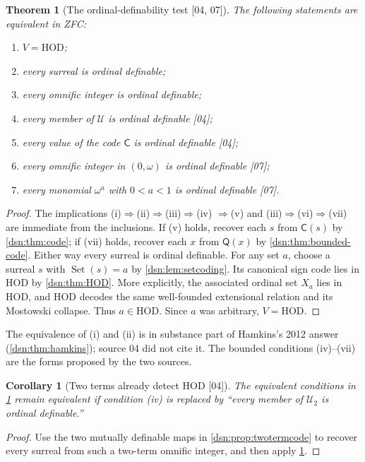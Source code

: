 \documentclass[11pt,a4paper]{article}
\numberwithin{equation}{section}
\newtheorem{theorem}{Theorem}[section]
\newtheorem{corollary}[corollary]{Corollary}
\theoremstyle{definition}
\theoremstyle{remark}
\newcommand{\HOD}{\mathrm{HOD}}
\newcommand{\Code}{\mathsf C}
\newcommand{\Mc}{\mathsf Q}
\newcommand{\SetDec}{\operatorname{Set}}
\newcommand{\Cell}{\mathcal U}
\newcommand{\src}[1]{\textup{\textsf{\small[#1]}}}
\begin{document}
\begin{theorem}[The ordinal-definability test \src{04, 07}]\label{dsn:thm:globalOD}
The following statements are equivalent in ZFC:
\begin{enumerate}[label=\textup{(\roman*)}]
\item $V=\HOD$;
\item every surreal is ordinal definable;
\item every omnific integer is ordinal definable;
\item every member of $\Cell$ is ordinal definable \src{04};
\item every value of the code $\Code$ is ordinal definable \src{04};
\item every omnific integer in $(0,\omega)$ is ordinal definable \src{07};
\item every monomial $\omega^a$ with $0<a<1$ is ordinal definable \src{07}.
\end{enumerate}
\end{theorem}
\begin{proof}
The implications (i)$\Rightarrow$(ii)$\Rightarrow$(iii)$\Rightarrow$(iv)
$\Rightarrow$(v) and (iii)$\Rightarrow$(vi)$\Rightarrow$(vii) are immediate
from the inclusions. If (v) holds, recover each $s$ from $\Code(s)$ by
\cref{dsn:thm:code}; if (vii) holds, recover each $x$ from $\Mc(x)$ by
\cref{dsn:thm:bounded-code}. Either way every surreal is ordinal definable.
For any set $a$, choose a surreal $s$ with $\SetDec(s)=a$ by
\cref{dsn:lem:setcoding}. Its canonical sign code lies in $\HOD$ by
\cref{dsn:thm:HOD}. More explicitly, the associated ordinal set $X_a$ lies
in $\HOD$, and $\HOD$ decodes the same well-founded extensional relation
and its Mostowski collapse. Thus $a\in\HOD$. Since $a$ was arbitrary,
$V=\HOD$.
\end{proof}

The equivalence of (i) and (ii) is in substance part of Hamkins's 2012
answer (\cref{dsn:thm:hamkins}); source 04 did not cite it. The bounded
conditions (iv)--(vii) are the forms proposed by the two sources.

\begin{corollary}[Two terms already detect HOD \src{04}]
The equivalent conditions in \cref{dsn:thm:globalOD} remain
equivalent if condition \textup{(iv)} is replaced by ``every member
of $\Cell_2$ is ordinal definable.''
\end{corollary}
\begin{proof}
Use the two mutually definable maps in \cref{dsn:prop:twotermcode} to
recover every surreal from such a two-term omnific integer, and then apply
\cref{dsn:thm:globalOD}.
\end{proof}
\end{document}
